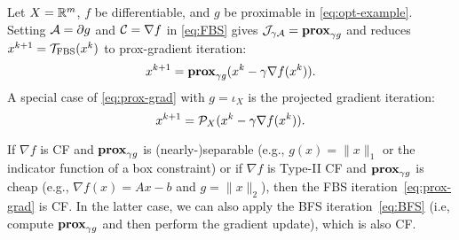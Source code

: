 {\begin{example}\label{alg:prox-grad} Let $X=\mathbb{R}^m$, $f$ be differentiable, and $g$ be proximable in \eqref{eq:opt-example}. Setting ${\mathcal{A}}=\partial g$ and ${\mathcal{C}}=\nabla f$ in \eqref{eq:FBS} gives ${\mathcal{J}}_{\gamma {\mathcal{A}}}=\mathbf{prox}_{\gamma g}$ and reduces $x^{k+1}={{\mathcal{T}}_{\mathrm{FBS}}}(x^k)$ to prox-gradient iteration: 
\begin{equation}\label{eq:prox-grad}x^{k+1}=\prox_{\gamma g}(x^k-\gamma\nabla f(x^k)).
\end{equation}
A special case of \eqref{eq:prox-grad} with $g=\iota_X$ is the projected gradient iteration:
\begin{equation}\label{eq:proj-grad}
x^{k+1}=\cP_X(x^k-\gamma \nabla f(x^k)).
\end{equation}

If $\nabla f$ is CF and $\mathbf{prox}_{\gamma g}$ is (nearly-)separable (e.g., $g(x)=\|x\|_1$ or the indicator function of a box constraint) or if $\nabla f$ is Type-II CF and $\mathbf{prox}_{\gamma g}$ is cheap (e.g., $\nabla f(x)=Ax-b$ and $g=\|x\|_2$), then the FBS iteration~\eqref{eq:prox-grad} is CF. In the latter case, we can also apply the BFS iteration~\eqref{eq:BFS} (i.e,  compute $\mathbf{prox}_ {\gamma g}$ and then perform the gradient update), which is also CF.

\end{example}


}
